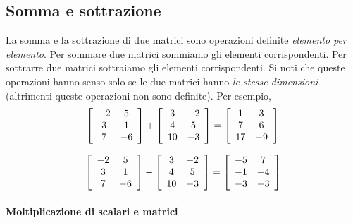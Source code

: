 \subsection{Somma e sottrazione}

La somma e la sottrazione di due matrici sono operazioni
    definite \emph{elemento per elemento}.
Per sommare
    due matrici sommiamo gli elementi corrispondenti.
Per sottrarre due matrici sottraiamo gli elementi
    corrispondenti.
Si noti che queste operazioni hanno senso solo se le due
    matrici hanno \emph{le stesse dimensioni} (altrimenti queste
    operazioni non sono definite).
Per esempio,
\begin{displaymath}
\left[ \begin{array}{c c}
-2 & 5\\
3 & 1\\
7 & -6
\end{array}
 \right]+
\left[ \begin{array}{c c}
3 & -2\\
4 & 5\\
10 & -3
\end{array}
 \right]=
 \left[ \begin{array}{c c}
1 & 3\\
7 & 6\\
17 & -9
\end{array}
 \right]
\end{displaymath}

\begin{displaymath}
\left[ \begin{array}{c c}
-2 & 5\\
3 & 1\\
7 & -6
\end{array}
 \right]-
\left[ \begin{array}{c c}
3 & -2\\
4 & 5\\
10 & -3
\end{array}
 \right]=
 \left[ \begin{array}{c c}
-5 & 7\\
-1 & -4\\
-3 & -3
\end{array}
 \right]
\end{displaymath}

\paragraph{Moltiplicazione di scalari e matrici}

